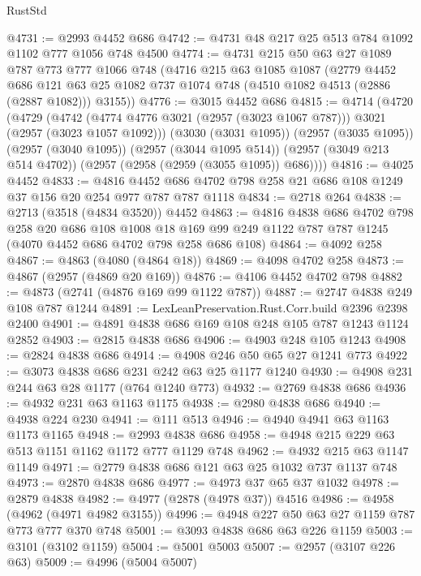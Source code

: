 \begin{lexlean}{RustStd}
\begin{coremodule}
@4731 := @2993 @4452 @686
@4742 := @4731 @48 @217 @25 @513 @784 @1092 @1102 @777 @1056 @748 @4500
@4774 := @4731
    @215
    @50
    @63
    @27
    @1089
    @787
    @773
    @777
    @1066
    @748
    (@4716
      @215
      @63
      @1085
      @1087
      (@2779
        @4452
        @686
        @121
        @63
        @25
        @1082
        @737
        @1074
        @748
        (@4510 @1082 @4513 (@2886 (@2887 @1082)))
        @3155))
@4776 := @3015 @4452 @686
@4815 := @4714
    (@4720
      (@4729
        (@4742 (@4774 @4776 @3021 (@2957 (@3023 @1067 @787))) @3021 (@2957 (@3023 @1057 @1092)))
        (@3030 (@3031 @1095))
        (@2957 (@3035 @1095))
        (@2957 (@3040 @1095))
        (@2957 (@3044 @1095 @514))
        (@2957 (@3049 @213 @514 @4702))
        (@2957 (@2958 (@2959 (@3055 @1095)) @686))))
@4816 := @4025 @4452
@4833 := @4816 @4452 @686 @4702 @798 @258 @21 @686 @108 @1249 @37 @156 @20 @254 @977 @787 @787 @1118
@4834 := @2718 @264
@4838 := @2713 (@3518 (@4834 @3520)) @4452
@4863 := @4816
    @4838
    @686
    @4702
    @798
    @258
    @20
    @686
    @108
    @1008
    @18
    @169
    @99
    @249
    @1122
    @787
    @787
    @1245
    (@4070 @4452 @686 @4702 @798 @258 @686 @108)
@4864 := @4092 @258
@4867 := @4863 (@4080 (@4864 @18))
@4869 := @4098 @4702 @258
@4873 := @4867 (@2957 (@4869 @20 @169))
@4876 := @4106 @4452 @4702 @798
@4882 := @4873 (@2741 (@4876 @169 @99 @1122 @787))
@4887 := @2747 @4838 @249 @108 @787 @1244
@4891 := LexLeanPreservation.Rust.Corr.build @2396 @2398 @2400
@4901 := @4891 @4838 @686 @169 @108 @248 @105 @787 @1243 @1124 @2852
@4903 := @2815 @4838 @686
@4906 := @4903 @248 @105 @1243
@4908 := @2824 @4838 @686
@4914 := @4908 @246 @50 @65 @27 @1241 @773
@4922 := @3073 @4838 @686 @231 @242 @63 @25 @1177 @1240
@4930 := @4908 @231 @244 @63 @28 @1177 (@764 @1240 @773)
@4932 := @2769 @4838 @686
@4936 := @4932 @231 @63 @1163 @1175
@4938 := @2980 @4838 @686
@4940 := @4938 @224 @230
@4941 := @111 @513
@4946 := @4940 @4941 @63 @1163 @1173 @1165
@4948 := @2993 @4838 @686
@4958 := @4948 @215 @229 @63 @513 @1151 @1162 @1172 @777 @1129 @748
@4962 := @4932 @215 @63 @1147 @1149
@4971 := @2779 @4838 @686 @121 @63 @25 @1032 @737 @1137 @748
@4973 := @2870 @4838 @686
@4977 := @4973 @37 @65 @37 @1032
@4978 := @2879 @4838
@4982 := @4977 (@2878 (@4978 @37)) @4516
@4986 := @4958 (@4962 (@4971 @4982 @3155))
@4996 := @4948 @227 @50 @63 @27 @1159 @787 @773 @777 @370 @748
@5001 := @3093 @4838 @686 @63 @226 @1159
@5003 := @3101 (@3102 @1159)
@5004 := @5001 @5003
@5007 := @2957 (@3107 @226 @63)
@5009 := @4996 (@5004 @5007)

\end{coremodule}
\end{lexlean}

